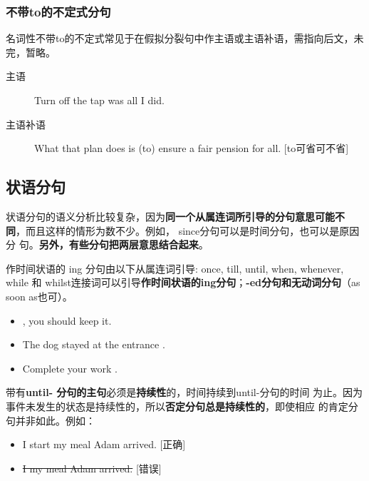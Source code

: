 \subsubsection{不带to的不定式分句}

名词性不带to的不定式常见于在假拟分裂句中作主语或主语补语，需指向后文，未完，暂略。
\begin{description}
\item[主语] Turn off the tap was all I did.
\item[主语补语] What that plan does is (to) ensure a fair pension for all.
  [to可省可不省]
\end{description}



\subsection{状语分句}

状语分句的语义分析比较复杂，因为\textbf{同一个从属连词所引导的分句意思可能不
  同}，而且这样的情形为数不少。例如， since分句可以是时间分句，也可以是原因分
句。\textbf{另外，有些分句把两层意思结合起来}。

作时间状语的 ing 分句由以下从属连词引导: once, till, until, when, whenever,
while 和 whilst连接词可以引导\textbf{作时间状语的ing分句}；\textbf{-ed分句和无动词分句}（as soon
as也可）。
\begin{itemize}
\item {}, you should keep it.
\item The dog stayed at the entrance .
\item Complete your work .
\end{itemize}

带有\textbf{until- 分句的主句}必须是\textbf{持续性}的，时间持续到until-分句的时间
为止。因为事件未发生的状态是持续性的，所以\textbf{否定分句总是持续性的}，即使相应
的肯定分句并非如此。例如：
\begin{itemize}
\item I  start my meal  Adam arrived. [正确]
\item \sout{I  my meal  Adam arrived.} [错误]
\end{itemize}


